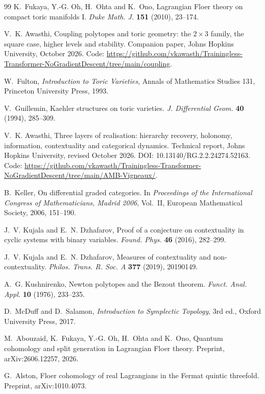 \documentclass[11pt]{article}
\theoremstyle{definition}
\theoremstyle{remark}
\begin{document}
\begin{thebibliography}{99}
K.~Fukaya, Y.-G. Oh, H.~Ohta and K.~Ono, Lagrangian Floer theory on compact toric manifolds {I}. \emph{Duke Math. J.} \textbf{151}
(2010), 23--174.

V.~K. Awasthi, Coupling polytopes and toric geometry: the $2\times3$ family, the square case, higher levels and stability.
Companion paper, Johns Hopkins University, October 2026. Code: \url{https://github.com/vkawasth/Trainingless-Transformer-NoGradientDescent/tree/main/coupling}.

W.~Fulton, \emph{Introduction to Toric Varieties}, Annals of Mathematics Studies 131, Princeton University Press, 1993.

V.~Guillemin, Kaehler structures on toric varieties. \emph{J. Differential Geom.} \textbf{40} (1994), 285--309.

V.~K. Awasthi, Three layers of realisation: hierarchy recovery, holonomy, information, contextuality and categorical
dynamics. Technical report, Johns Hopkins University, revised October 2026. DOI: 10.13140/RG.2.2.24274.52163. Code: \url{https://github.com/vkawasth/Trainingless-Transformer-NoGradientDescent/tree/main/AMB-Vigneaux/}.

B.~Keller, On differential graded categories. In \emph{Proceedings of the International Congress of Mathematicians, Madrid 2006},
Vol.~II, European Mathematical Society, 2006, 151--190.

J.~V. Kujala and E.~N. Dzhafarov, Proof of a conjecture on contextuality in cyclic systems with binary variables. \emph{Found. Phys.}
\textbf{46} (2016), 282--299.

J.~V. Kujala and E.~N. Dzhafarov, Measures of contextuality and non-contextuality. \emph{Philos. Trans. R. Soc. A} \textbf{377} (2019),
20190149.

A.~G. Kushnirenko, Newton polytopes and the Bezout theorem. \emph{Funct. Anal. Appl.} \textbf{10} (1976), 233--235.

D.~McDuff and D.~Salamon, \emph{Introduction to Symplectic Topology}, 3rd ed., Oxford University Press, 2017.

M.~Abouzaid, K.~Fukaya, Y.-G. Oh, H.~Ohta and K.~Ono, Quantum cohomology and split generation in Lagrangian Floer theory.
Preprint, arXiv:2606.12257, 2026.

G.~Alston, Floer cohomology of real Lagrangians in the Fermat quintic threefold. Preprint, arXiv:1010.4073.


\end{thebibliography}
\end{document}
